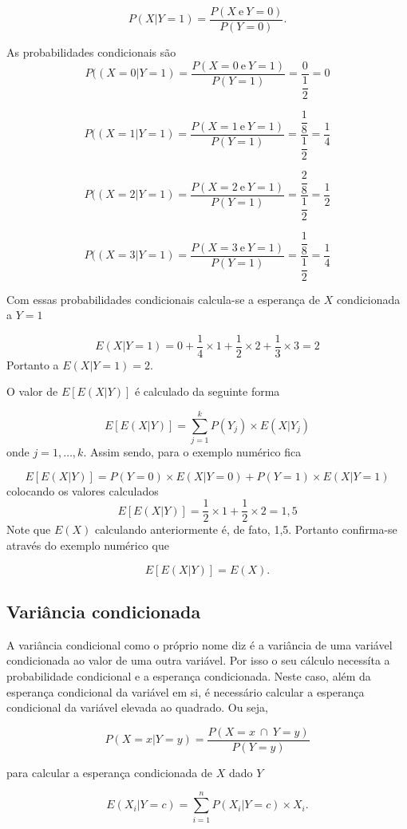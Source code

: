 \documentclass[
]{book}
\begin{document}
\[
  P(X|Y=1) = \dfrac{P(X~\text{e}~Y=0)}{P(Y=0)}.
\]

As probabilidades condicionais são
\[
  P((X=0|Y=1) = \dfrac{P(X=0~\text{e}~Y=1)}{P(Y=1)}= \dfrac{0}{\dfrac{1}{2}}= 0
\]

\[
  P((X=1|Y=1) = \dfrac{P(X=1~\text{e}~Y=1)}{P(Y=1)}= \dfrac{\dfrac{1}{8}}{\dfrac{1}{2}}= \dfrac{1}{4}
\]

\[
  P((X=2|Y=1) = \dfrac{P(X=2~\text{e}~Y=1)}{P(Y=1)}= \dfrac{\dfrac{2}{8}}{\dfrac{1}{2}}= \dfrac{1}{2}
\]

\[
  P((X=3|Y=1) = \dfrac{P(X=3~\text{e}~Y=1)}{P(Y=1)}= \dfrac{\dfrac{1}{8}}{\dfrac{1}{2}}= \dfrac{1}{4}
\]

Com essas probabilidades condicionais calcula-se a esperança de \(X\) condicionada a \(Y=1\)

\[
  E(X|Y=1) = 0 + \frac{1}{4} \times 1 + \frac{1}{2}\times 2 + \dfrac{1}{3} \times 3 = 2
\]
Portanto a \(E(X|Y=1) = 2\).

O valor de \(E[E(X|Y)]\) é calculado da seguinte forma

\[
  E[E(X|Y)] = \sum_{j=1}^{k} P(Y_j)\times E(X|Y_j)
\]
onde \(j=1,\ldots,k\). Assim sendo, para o exemplo numérico fica

\[
  E[E(X|Y)] = P(Y=0) \times E(X|Y=0) + P(Y=1) \times E(X|Y=1)
\]
colocando os valores calculados
\[
  E[E(X|Y)] = \dfrac{1}{2} \times 1 + \frac{1}{2} \times 2 = 1,5 
\]
Note que \(E(X)\) calculando anteriormente é, de fato, 1,5. Portanto confirma-se através do exemplo numérico que

\[
  E[E(X|Y)] = E(X).
\]

\hypertarget{variuxe2ncia-condicionada}{%
\subsection{Variância condicionada}\label{variuxe2ncia-condicionada}}

A variância condicional como o próprio nome diz é a variância de uma variável condicionada ao valor de uma outra variável. Por isso o seu cálculo necessíta a probabilidade condicional e a esperança condicionada. Neste caso, além da esperança condicional da variável em si, é necessário calcular a esperança condicional da variável elevada ao quadrado. Ou seja,

\[
  P(X=x|Y=y) = \dfrac{P (X=x~\cap~Y=y)}{P(Y=y)}
\]

para calcular a esperança condicionada de \(X\) dado \(Y\)

\[
  E(X_i|Y=c) = \sum_{i=1}^{n} P(X_i| Y=c) \times X_i.
\]
\end{document}
